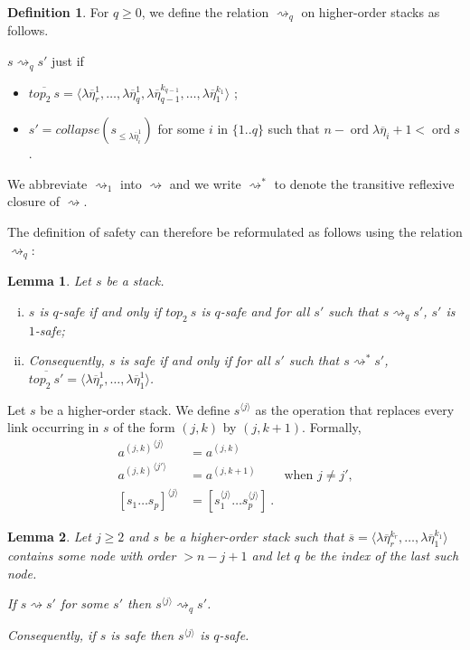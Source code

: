 \documentclass{article}
\newcommand{\ord}{\mathop{\mathrm{ord}}}
\newcommand{\prefixof}{\leqslant}
\newtheorem{lemma}{Lemma}[section]
\theoremstyle{remark}
\theoremstyle{definition}
\newtheorem{definition}{Definition}[section]
\newcommand\orddec\overline
\newcommand\saferel\rightsquigarrow
\begin{document}
\begin{definition}
For $q\geq 0$, we define the relation $\saferel_q$ on higher-order
stacks as follows.

$s \saferel_q s'$ just if
\begin{itemize}
\item $\orddec{top_2\ s} = \langle \lambda \overline{\eta}_r^1, \ldots , \lambda
\overline{\eta}_q^1, \lambda \overline{\eta}_{q-1}^{k_{q-1}}, \ldots
, \lambda \overline{\eta}_1^{k_1} \rangle$ ;

\item $s' = collapse (s_{\prefixof \lambda \overline{\eta}_i^1})$ for some $i$ in
$\{1..q\}$ such that $n - \ord{\lambda \overline{\eta}_i} + 1 <
\ord{s}$.
\end{itemize}

We abbreviate $\saferel_1$ into $\saferel$ and we write $\saferel^*$ to denote the transitive reflexive closure of $\saferel$.

\end{definition}
The definition of safety can therefore be reformulated as follows
using the relation $\saferel_q$:
\begin{lemma}
\label{lem:qsafety_equivdef}
 Let $s$ be a stack.
\begin{enumerate}[i.]
  \item $s$ is $q$-safe if and only if $top_2\ s$ is $q$-safe and for all $s'$ such that $s \saferel_q s'$, $s'$ is $1$-safe;

  \item Consequently, $s$ is safe if and only if for all $s'$ such that $s
  \saferel^*
s'$, $\orddec{top_2\ s'} = \langle \lambda \overline{\eta}_r^1,
\ldots , \lambda \overline{\eta}_1^{1} \rangle$.
\end{enumerate}
\end{lemma}

Let $s$ be a higher-order stack. We define $s^{\langle j \rangle}$ as the operation that replaces
every link occurring in $s$ of the form $(j,k)$ by $(j,k+1)$. Formally,
\begin{align*}
{a^{(j,k)}}^{\langle j \rangle} &= a^{(j,k)}   \\
{a^{(j,k)}}^{\langle j' \rangle} &= a^{(j,k+1)} &   \mbox{when $j\neq j'$,}\\
[s_1 \ldots s_p]^{\langle j \rangle} &= [s_1^{\langle j \rangle} \ldots s_p^{\langle j \rangle}] \ .
\end{align*}

\begin{lemma}
\label{lem:incrk_qsafe}
 Let $j\geq2$ and $s$ be a higher-order stack
such that $\orddec{s} = \langle \lambda \overline{\eta}_r^{k_r},
\ldots , \lambda \overline{\eta}_1^{k_1} \rangle$ contains some node
with order $>n-j+1$ and let $q$ be the index of the last such node.

If $s \saferel s'$ for some $s'$ then $s^{\langle j \rangle}
\saferel_q s'$.

Consequently, if $s$ is safe then $s^{\langle j \rangle}$ is $q$-safe.
\end{lemma}
\end{document}
